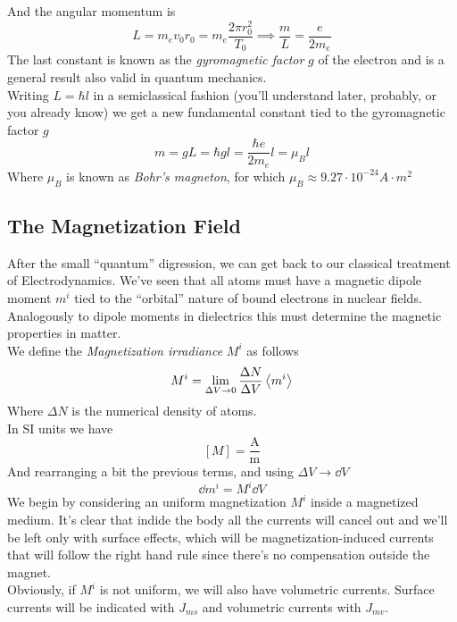 \documentclass[../electromagnetism.tex]{subfiles}
\begin{document}
And the angular momentum is
\begin{equation*}
	L=m_ev_0r_0=m_e\frac{2\pi r_0^2}{T_0}\implies\frac{m}{L}=\frac{e}{2m_e}
\end{equation*}
The last constant is known as the \textit{gyromagnetic factor} $g$ of the electron and is a general result also valid in quantum mechanics.\\
Writing $L=\hbar l$ in a semiclassical fashion (you'll understand later, probably, or you already know) we get a new fundamental constant tied to the gyromagnetic factor $g$
\begin{equation*}
	m=gL=\hbar gl=\frac{\hbar e}{2m_e}l=\mu_Bl
\end{equation*}
Where $\mu_B$ is known as \textit{Bohr's magneton}, for which $\mu_B\approx 9.27\cdot10^{-24}\unit{A\cdot m^2}$
\subsection{The Magnetization Field}
After the small ``quantum'' digression, we can get back to our classical treatment of Electrodynamics. We've seen that all atoms must have a magnetic dipole moment $m^i$ tied to the ``orbital'' nature of bound electrons in nuclear fields. Analogously to dipole moments in dielectrics this must determine the magnetic properties in matter.\\
We define the \textit{Magnetization irradiance} $M^i$ as follows
\begin{equation}
	M^i=\lim_{\Delta V\to 0}\frac{\Delta N}{\Delta V}\expval{m^i}
	\label{eq:magintdef}
\end{equation}
Where $\Delta N$ is the numerical density of atoms.\\
In SI units we have
\begin{equation*}
	\left[ M \right]=\mathrm{\frac{A}{m}}
\end{equation*}
And rearranging a bit the previous terms, and using $\Delta V\to \dd V$
\begin{equation}
	\dd m^i=M^i\dd V
	\label{eq:magvsmagdip}
\end{equation}
We begin by considering an uniform magnetization $M^i$ inside a magnetized medium. It's clear that indide the body all the currents will cancel out and we'll be left only with surface effects, which will be magnetization-induced currents that will follow the right hand rule since there's no compensation outside the magnet.\\
Obviously, if $M^i$ is not uniform, we will also have volumetric currents. Surface currents will be indicated with $J_{ms}$ and volumetric currents with $J_{mv}$.\\
\end{document}
